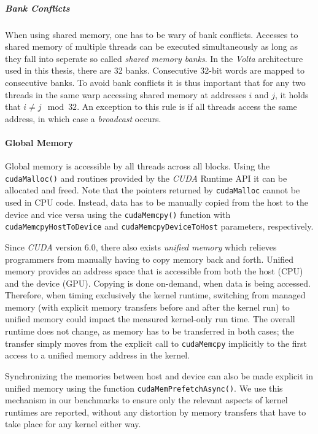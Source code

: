 \subparagraph{Bank Conflicts}
When using shared memory, one has to be wary of bank conflicts. Accesses to shared memory of multiple threads can be executed simultaneously as long as they fall into seperate so called \emph{shared memory banks}. In the \emph{Volta} architecture used in this thesis, there are 32 banks. Consecutive 32-bit words are mapped to consecutive banks. To avoid bank conflicts it is thus important that for any two threads in the same warp accessing shared memory at addresses $i$ and $j$, it holds that $i \neq j \mod 32$. An exception to this rule is if all threads access the same address, in which case a \emph{broadcast} occurs.

\paragraph{Global Memory}	\label{sec:unified-memory}
Global memory is accessible by all threads across all blocks. Using the \texttt{cudaMalloc()} and  routines provided by the \emph{CUDA} Runtime API it can be allocated and freed. Note that the pointers returned by \texttt{cudaMalloc} cannot be used in CPU code. Instead, data has to be manually copied from the host to the device and vice versa using the \texttt{cudaMemcpy()} function with \texttt{cudaMemcpyHostToDevice} and \texttt{cudaMemcpyDeviceToHost} parameters, respectively. 

Since \emph{CUDA} version 6.0, there also exists \emph{unified memory} which relieves programmers from manually having to copy memory back and forth. Unified memory provides an address space that is accessible from both the host (CPU) and the device (GPU). Copying is done on-demand, when data is being accessed. Therefore, when timing exclusively the kernel runtime, switching from managed memory (with explicit memory transfers before and after the kernel run) to unified memory could impact the measured kernel-only run time. The overall runtime does not change, as memory has to be transferred in both cases; the transfer simply moves from the explicit call to \texttt{cudaMemcpy} implicitly to the first access to a unified memory address in the kernel.

Synchronizing the memories between host and device can also be made explicit in unified memory using the function \texttt{cudaMemPrefetchAsync()}. We use this mechanism in our benchmarks to ensure only the relevant aspects of kernel runtimes are reported, without any distortion by memory transfers that have to take place for any kernel either way.

